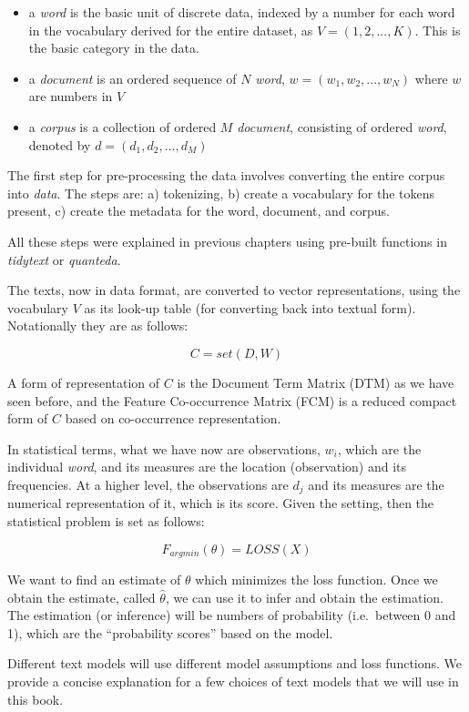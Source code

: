 \documentclass[
]{article}
\providecommand{\tightlist}{%
  \setlength{\itemsep}{0pt}\setlength{\parskip}{0pt}}
\begin{document}
\begin{itemize}
\tightlist
\item
  a \emph{word} is the basic unit of discrete data, indexed by a number for each word in the vocabulary derived for the entire dataset, as \(V = ({1,2,...,K})\). This is the basic category in the data.
\item
  a \emph{document} is an ordered sequence of \(N\) \emph{word}, \(w = ({w_1,w_2,...,w_N})\) where \(w\) are numbers in \(V\)
\item
  a \emph{corpus} is a collection of ordered \(M\) \emph{document}, consisting of ordered \emph{word}, denoted by \(d = ({d_1,d_2,...,d_M})\)
\end{itemize}

The first step for pre-processing the data involves converting the entire corpus into \emph{data}. The steps are:
a) tokenizing,
b) create a vocabulary for the tokens present,
c) create the metadata for the word, document, and corpus.

All these steps were explained in previous chapters using pre-built functions in \emph{tidytext} or \emph{quanteda}.

The texts, now in data format, are converted to vector representations, using the vocabulary \(V\) as its look-up table (for converting back into textual form). Notationally they are as follows:

\[C = set (D,W)\]

A form of representation of \(C\) is the Document Term Matrix (DTM) as we have seen before, and the Feature Co-occurrence Matrix (FCM) is a reduced compact form of \(C\) based on co-occurrence representation.

In statistical terms, what we have now are observations, \(w_i\), which are the individual \emph{word}, and its measures are the location (observation) and its frequencies. At a higher level, the observations are \(d_j\) and its measures are the numerical representation of it, which is its score. Given the setting, then the statistical problem is set as follows:

\[F_{argmin}(\theta) = LOSS(X)\]

We want to find an estimate of \(\theta\) which minimizes the loss function. Once we obtain the estimate, called \(\hat{\theta}\), we can use it to infer and obtain the estimation. The estimation (or inference) will be numbers of probability (i.e.~between 0 and 1), which are the ``probability scores'' based on the model.

Different text models will use different model assumptions and loss functions. We provide a concise explanation for a few choices of text models that we will use in this book.
\end{document}
